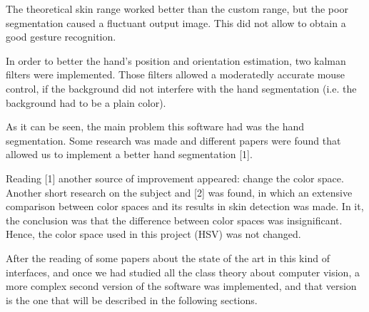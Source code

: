 The theoretical skin range worked better than the custom range, but the poor segmentation caused a fluctuant output image. This did not allow to obtain a good gesture recognition.   

In order to better the hand's position and orientation estimation, two kalman filters were implemented. Those filters allowed a moderatedly accurate mouse control, if the background did not interfere with the hand segmentation (i.e. the background had to be a plain color). 

As it can be seen, the main problem this software had was the hand segmentation. Some research was made and different papers were found that allowed us to implement a better hand segmentation [1].

Reading [1] another source of improvement appeared: change the color space. Another short research on the subject and [2] was found, in which an extensive comparison between color spaces and its results in skin detection was made. In it, the conclusion was that the difference between color spaces was insignificant. Hence, the color space used in this project (HSV) was not changed. 

After the reading of some papers about the state of the art in this kind of interfaces, and once we had studied all the class theory about computer vision, a more complex second version of the software was implemented, and that version is the one that will be described in the following sections.
\newpage